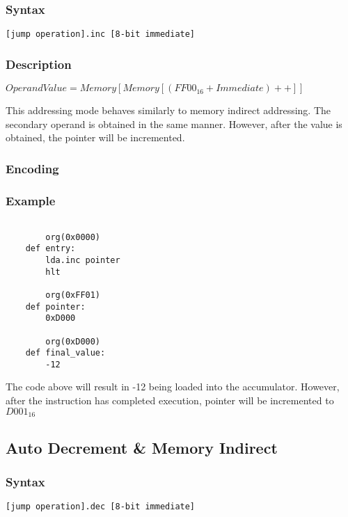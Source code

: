 \subsubsection{Syntax}
\begin{verbatim}[jump operation].inc [8-bit immediate]\end{verbatim}

\subsubsection{Description}
$OperandValue = Memory[Memory[(FF00_{16} + Immediate)++]]$\\
\par This addressing mode behaves similarly to memory indirect addressing.
The secondary operand is obtained in the same manner.
However, after the value is obtained, the pointer will be incremented.

\subsubsection{Encoding}

\subsubsection{Example}
\begin{verbatim}

        org(0x0000)
    def entry:
        lda.inc pointer
        hlt

        org(0xFF01)
    def pointer:
        0xD000

        org(0xD000)
    def final_value:
        -12

\end{verbatim}
The code above will result in -12 being loaded into the accumulator.
However, after the instruction has completed execution, pointer will be incremented to $D001_{16}$
\pagebreak

\subsection{Auto Decrement \& Memory Indirect}\label{subsec:auto-decrement-&-memory-indirect-(dec)}
\subsubsection{Syntax}
\begin{verbatim}[jump operation].dec [8-bit immediate]\end{verbatim}

